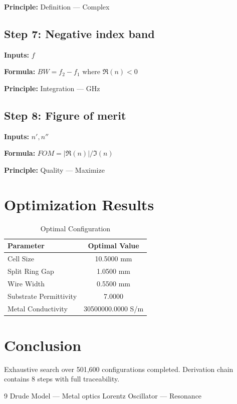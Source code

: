 \documentclass[11pt,twocolumn]{article}
\begin{document}
\textbf{Principle:} Definition --- Complex

\subsection*{Step 7: Negative index band}
\textbf{Inputs:} $f$

\textbf{Formula:} $BW = f_2 - f_1 \text{ where } \Re(n) < 0$

\textbf{Principle:} Integration --- GHz

\subsection*{Step 8: Figure of merit}
\textbf{Inputs:} $n', n''$

\textbf{Formula:} $FOM = |\Re(n)|/\Im(n)$

\textbf{Principle:} Quality --- Maximize


\section{Optimization Results}
\begin{table}[h]
\centering
\caption{Optimal Configuration}
\begin{tabular}{@{}lc@{}}
\toprule
Parameter & Optimal Value \\
\midrule
Cell Size & 10.5000 mm \\
Split Ring Gap & 1.0500 mm \\
Wire Width & 0.5500 mm \\
Substrate Permittivity & 7.0000  \\
Metal Conductivity & 30500000.0000 S/m \\
\bottomrule
\end{tabular}
\end{table}

\section{Conclusion}
Exhaustive search over 501,600 configurations completed.
Derivation chain contains 8 steps with full traceability.

\begin{thebibliography}{9}
 Drude Model --- Metal optics
 Lorentz Oscillator --- Resonance
\end{thebibliography}
\end{document}
